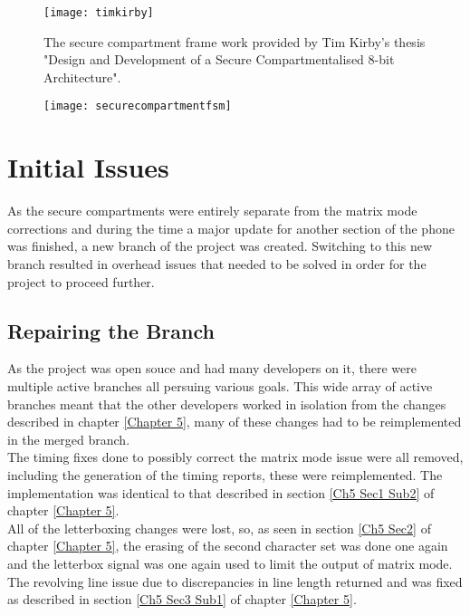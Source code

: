 \begin{figure}
  \centering
  \texttt{[image: timkirby]}
  \caption{The secure compartment frame work provided by Tim Kirby's thesis "Design and Development of a Secure Compartmentalised 8-bit Architecture".}
  \label{fig:timkirby}
\end{figure}

\begin{figure}
  \centering
  \texttt{[image: securecompartmentfsm]}
  \caption{}
  \label{fig:securecompartmentsfsm}
\end{figure}


\section{Initial Issues}

\label{Ch6 Sec2}

As the secure compartments were entirely separate from the matrix mode corrections and during the time a major update for another section of the phone was finished, a new branch of the project was created. Switching to this new branch resulted in overhead issues that needed to be solved in order for the project to proceed further.

\subsection{Repairing the Branch}

\label{Ch6 Sec2 Sub1}

As the project was open souce and had many developers on it, there were multiple active branches all persuing various goals. This wide array of active branches meant that the other developers worked in isolation from the changes described in chapter \ref{Chapter 5}, many of these changes had to be reimplemented in the merged branch.\\
The timing fixes done to possibly correct the matrix mode issue were all removed, including the generation of the timing reports, these were reimplemented. The implementation was identical to that described in section \ref{Ch5 Sec1 Sub2} of chapter \ref{Chapter 5}.\\
All of the letterboxing changes were lost, so, as seen in section \ref{Ch5 Sec2} of chapter \ref{Chapter 5}, the erasing of the second character set was done one again and the letterbox signal was one again used to limit the output of matrix mode.\\
The revolving line issue due to discrepancies in line length returned and was fixed as described in section \ref{Ch5 Sec3 Sub1} of chapter \ref{Chapter 5}.\\

